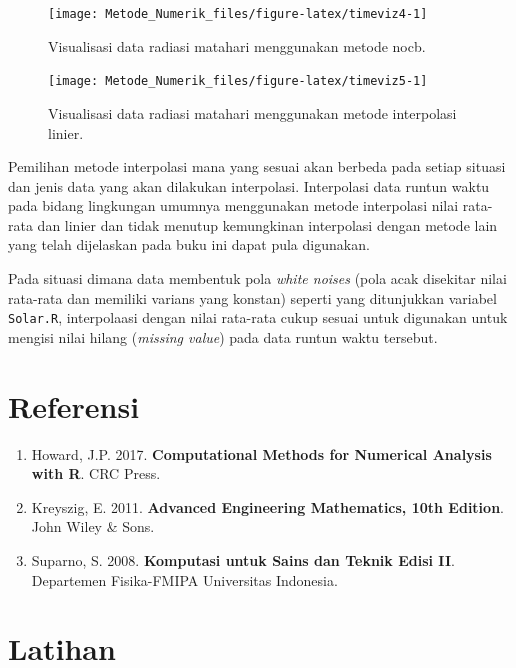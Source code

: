 \documentclass[
]{book}
\providecommand{\tightlist}{%
  \setlength{\itemsep}{0pt}\setlength{\parskip}{0pt}}
\theoremstyle{definition}
\theoremstyle{definition}
\theoremstyle{definition}
\theoremstyle{definition}
\theoremstyle{remark}
\begin{document}
\begin{figure}

{\centering \texttt{[image: Metode\_Numerik\_files/figure-latex/timeviz4-1]} 

}

\caption{Visualisasi data radiasi matahari menggunakan metode nocb.}\label{fig:timeviz4}
\end{figure}

\begin{figure}

{\centering \texttt{[image: Metode\_Numerik\_files/figure-latex/timeviz5-1]} 

}

\caption{Visualisasi data radiasi matahari menggunakan metode interpolasi linier.}\label{fig:timeviz5}
\end{figure}

Pemilihan metode interpolasi mana yang sesuai akan berbeda pada setiap situasi dan jenis data yang akan dilakukan interpolasi. Interpolasi data runtun waktu pada bidang lingkungan umumnya menggunakan metode interpolasi nilai rata-rata dan linier dan tidak menutup kemungkinan interpolasi dengan metode lain yang telah dijelaskan pada buku ini dapat pula digunakan.

Pada situasi dimana data membentuk pola \emph{white noises} (pola acak disekitar nilai rata-rata dan memiliki varians yang konstan) seperti yang ditunjukkan variabel \texttt{Solar.R}, interpolaasi dengan nilai rata-rata cukup sesuai untuk digunakan untuk mengisi nilai hilang (\emph{missing value}) pada data runtun waktu tersebut.

\hypertarget{referensi-3}{%
\section{Referensi}\label{referensi-3}}

\begin{enumerate}
\def\labelenumi{\arabic{enumi}.}
\tightlist
\item
  Howard, J.P. 2017. \textbf{Computational Methods for Numerical Analysis with R}. CRC Press.
\item
  Kreyszig, E. 2011. \textbf{Advanced Engineering Mathematics, 10th Edition}. John Wiley \& Sons.
\item
  Suparno, S. 2008. \textbf{Komputasi untuk Sains dan Teknik Edisi II}. Departemen Fisika-FMIPA Universitas Indonesia.
\end{enumerate}

\hypertarget{latihan-2}{%
\section{Latihan}\label{latihan-2}}
\end{document}
